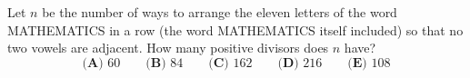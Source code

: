 Let $n$ be the number of ways to arrange the eleven letters of the word MATHEMATICS in a row (the word MATHEMATICS itself included) so that no two vowels are adjacent. How many positive divisors does $n$ have?
\[
\textbf{(A) }60\qquad\textbf{(B) }84\qquad\textbf{(C) }162\qquad\textbf{(D) }216\qquad\textbf{(E) }108
\]
